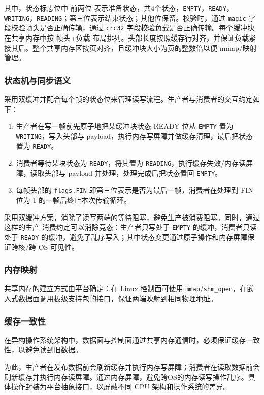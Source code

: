 其中，状态标志位中 前两位 表示准备状态，共4个状态，\verb|EMPTY|，\verb|READY|，\verb|WRITING|，\verb|READING|；第三位表示结束状态；其他位保留。校验时，通过 \verb|magic| 字段校验帧头是否正确传输，通过 \verb|crc32| 字段校验负载是否正确传输。每个缓冲块在共享内存中按 帧头+负载 布局排列。头部长度按照缓存行对齐，并保证负载紧接其后。整个共享内存区按页对齐，且缓冲块大小为页的整数倍以便 mmap/映射管理。

\subsubsection{状态机与同步语义}
采用双缓冲并配合每个帧的状态位来管理读写流程。生产者与消费者的交互约定如下：

\begin{enumerate}
  \item 生产者在写一帧前先原子地把某缓冲块状态 READY 位从 \texttt{EMPTY} 置为 \texttt{WRITING}，写入头部与 payload，执行内存写屏障并做缓存清理，最后把状态置为 \texttt{READY}。
  \item 消费者等待某块状态为 \texttt{READY}，将其置为 \texttt{READING}，执行缓存失效/内存读屏障，读取头部与 payload 并处理，处理完成后把状态置回 \texttt{EMPTY}。
  \item 每帧头部的 \texttt{flags.FIN} 即第三位表示是否为最后一帧，消费者在处理到 FIN 位为 1 的一帧后终止本次传输循环。
\end{enumerate}

采用双缓冲方案，消除了读写两端的等待阻塞，避免生产被消费阻塞。同时，通过这样的生产-消费约定可以消除竞态：生产者只写处于 \texttt{EMPTY} 的缓冲，消费者只读处于 \texttt{READY} 的缓冲，避免了乱序写入；其中状态变更通过原子操作和内存屏障保证跨核/跨 OS 可见性。

\subsubsection{内存映射}
共享内存的建立方式由平台确定：在 Linux 控制面可使用 \texttt{mmap}/\texttt{shm\_open}，在嵌入式数据面调用板级支持包的接口，保证两端映射到相同物理地址。

\subsubsection{缓存一致性}
在异构操作系统架构中，数据面与控制面通过共享内存通信时，必须保证缓存一致性，以避免读到旧数据。  

为此，生产者在发布数据前会刷新缓存并执行内存写屏障；消费者在读取数据前会刷新缓存并执行内存读屏障。通过内存屏障，避免跨OS的内存读写操作乱序。具体操作封装为平台抽象接口，以屏蔽不同 CPU 架构和操作系统的差异。

